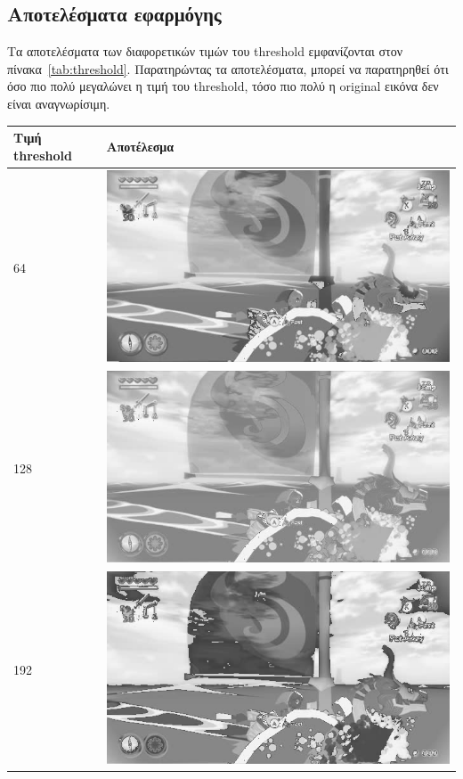 \subsection{Αποτελέσματα εφαρμόγης}

Τα αποτελέσματα των διαφορετικών τιμών του threshold εμφανίζονται στον πίνακα~\ref{tab:threshold}.
Παρατηρώντας τα αποτελέσματα, μπορεί να παρατηρηθεί ότι όσο πιο πολύ μεγαλώνει η τιμή του threshold, τόσο πιο πολύ η original εικόνα δεν είναι αναγνωρίσιμη.

\begin{table}[H]
  \centering
	\begin{tabular}{ | p{4cm} | p{12cm} | }
		\hline
		\textbf{Τιμή threshold} & \textbf{Αποτέλεσμα} \\
		\hline
		64 & \includegraphics[width=\linewidth]{Figures/threshold_64} \\
		\hline
		128 & \includegraphics[width=\linewidth]{Figures/threshold_128} \\
		\hline
		192 & \includegraphics[width=\linewidth]{Figures/threshold_192} \\

\end{tabular}
\end{table}

